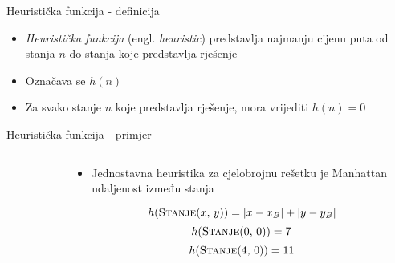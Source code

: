 \documentclass{beamer}
\newcommand{\engl}[1]{ (engl. \emph{#1})}
\newcommand{\twocolumns}[2]{
	\begin{columns}
		\begin{column}{0.4\textwidth}
			#1
		\end{column}
		\begin{column}{0.6\textwidth}  %
			#2
		\end{column}
	\end{columns}
}
\newcommand{\state}[2]{\textsc{Stanje}(\( #1 \), \( #2 \))}
\begin{document}
  \begin{frame}{Heuristička funkcija - definicija}
  	\begin{itemize}
  	  \item \emph{Heuristička funkcija} \engl{heuristic} predstavlja najmanju cijenu puta od stanja \( n \) do stanja koje predstavlja rješenje
  	  \item Označava se \( h(n) \)
  	  \item Za svako stanje \( n \) koje predstavlja rješenje, mora vrijediti \( h(n) = 0 \)
  	\end{itemize}
  \end{frame}

  \begin{frame}{Heuristička funkcija - primjer}
    \twocolumns{
    	\begin{figure}[H]
    		\begin{tikzpicture}
    		
    		\end{tikzpicture}
    	\end{figure}
    }{
    	\begin{itemize}
    		\item Jednostavna heuristika za cjelobrojnu rešetku je Manhattan udaljenost između stanja \\[0.5cm]
    	\end{itemize}
    	\[ h(\text{\state{x}{y}}) = |x - x_B| + |y - y_B| \]
    	\[ h(\text{\state{0}{0}}) = 7 \]
    	\[ h(\text{\state{4}{0}}) = 11 \]
    }
  \end{frame}
\end{document}
